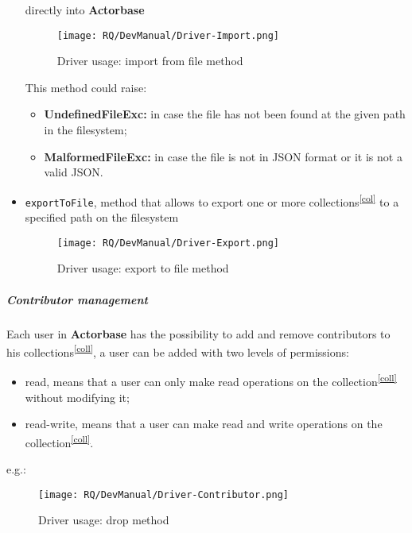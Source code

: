 \documentclass{scalatekids-article}
\begin{document}
\begin{itemize}
  directly into \textbf{Actorbase}
   \begin{figure}[H]
     \begin{center}
       \texttt{[image: RQ/DevManual/Driver-Import.png]}
       \caption{Driver usage: import from file method}
    \end{center}
   \end{figure}
  This method could raise:
  \begin{itemize}
  \item \textbf{UndefinedFileExc:} in case the file has not been found at the given path in the filesystem;
  \item \textbf{MalformedFileExc:} in case the file is not in JSON format or it is not a valid JSON.
  \end{itemize}

\item \verb=exportToFile=, method that allows to export one or more collections\textsuperscript{\ref{col}} to a specified path on the filesystem
   \begin{figure}[H]
     \begin{center}
       \texttt{[image: RQ/DevManual/Driver-Export.png]}
       \caption{Driver usage: export to file method}
     \end{center}
   \end{figure}
\end{itemize}

\subparagraph{Contributor management}

Each user in \textbf{Actorbase} has the possibility to add and remove contributors
to his collections\textsuperscript{\ref{coll}}, a user can be added with two levels of
permissions:
\begin{itemize}
\item read, means that a user can only make read operations on the collection\textsuperscript{\ref{coll}} without modifying it;
\item read-write, means that a user can make read and write operations on the collection\textsuperscript{\ref{coll}}.
\end{itemize}
e.g.:
 \begin{figure}[H]
   \begin{center}
     \texttt{[image: RQ/DevManual/Driver-Contributor.png]}
     \caption{Driver usage: drop method}
   \end{center}
 \end{figure}
\end{document}
